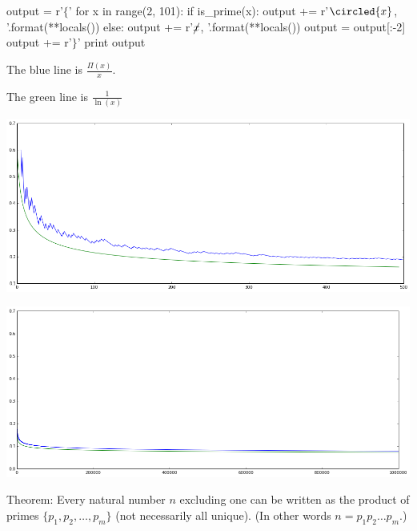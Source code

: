\item 

\begin{python}[tools.py]
output = r'$\{$'
for x in range(2, 101):
    if is_prime(x):
        output += r'$\circled{{{x}}}$, '.format(**locals())
    else:
        output += r'$\cancel{{{x}}}$, '.format(**locals())
output = output[:-2]
output += r'$\}$'
print output
\end{python}

\item 
The blue line is $\frac{\Pi(x)}{x}$.

The green line is $\frac{1}{\ln(x)}$

\includegraphics[width=6in]{resources/primes_small.png}

\includegraphics[width=6in]{resources/primes_large.png}

\item Theorem: Every natural number \(n\) excluding one can be written as the product of primes \(\{p_1, p_2, \dots, p_m\}\) (not necessarily all unique). (In other words \(n = p_1 p_2 \dots p_m\).)

